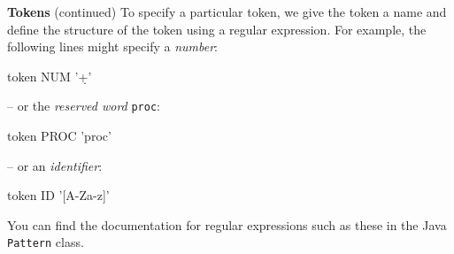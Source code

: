 \begin{minipage}[t]{\sw}
\slidenumber
\LARGE
{\bf Tokens} (continued)\exx
To specify a particular token,
we give the token a name and define the structure of the token
using a regular expression.
For example, the following lines might specify a {\em number}:
\begin{qv}
token NUM '\d+'
\end{qv}
-- or the {\em reserved word} \verb'proc':
\begin{qv}
token PROC 'proc'
\end{qv}
-- or an {\em identifier}:
\begin{qv}
token ID '[A-Za-z]\w*'
\end{qv}
You can find the documentation for regular expressions
such as these in the Java \verb'Pattern' class.\exx
\end{minipage}
